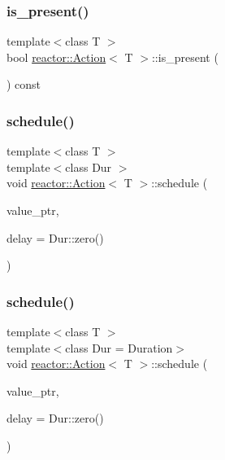 \subsubsection{\texorpdfstring{is\+\_\+present()}{is\_present()}}
{\footnotesize\ttfamily template$<$class T $>$ \\
bool \hyperlink{classreactor_1_1Action}{reactor\+::\+Action}$<$ T $>$\+::is\+\_\+present (\begin{DoxyParamCaption}{ }\end{DoxyParamCaption}) const\hspace{0.3cm}{\ttfamily [inline]}}

\mbox{\label{classreactor_1_1Action_a795f5b52075c020ec993d1149a720f62}} 
\subsubsection{\texorpdfstring{schedule()}{schedule()}\hspace{0.1cm}{\footnotesize\ttfamily [1/4]}}
{\footnotesize\ttfamily template$<$class T $>$ \\
template$<$class Dur $>$ \\
void \hyperlink{classreactor_1_1Action}{reactor\+::\+Action}$<$ T $>$\+::schedule (\begin{DoxyParamCaption}\item[{const \hyperlink{classreactor_1_1ImmutableValuePtr}{Immutable\+Value\+Ptr}$<$ T $>$ \&}]{value\+\_\+ptr,  }\item[{Dur}]{delay = {\ttfamily Dur\+:\+:zero()} }\end{DoxyParamCaption})}

\mbox{\label{classreactor_1_1Action_a863d3d618afb82404326c5076c9fd32a}} 
\subsubsection{\texorpdfstring{schedule()}{schedule()}\hspace{0.1cm}{\footnotesize\ttfamily [2/4]}}
{\footnotesize\ttfamily template$<$class T $>$ \\
template$<$class Dur  = Duration$>$ \\
void \hyperlink{classreactor_1_1Action}{reactor\+::\+Action}$<$ T $>$\+::schedule (\begin{DoxyParamCaption}\item[{\hyperlink{classreactor_1_1MutableValuePtr}{Mutable\+Value\+Ptr}$<$ T $>$ \&\&}]{value\+\_\+ptr,  }\item[{Dur}]{delay = {\ttfamily Dur\+:\+:zero()} }\end{DoxyParamCaption})\hspace{0.3cm}{\ttfamily [inline]}}

